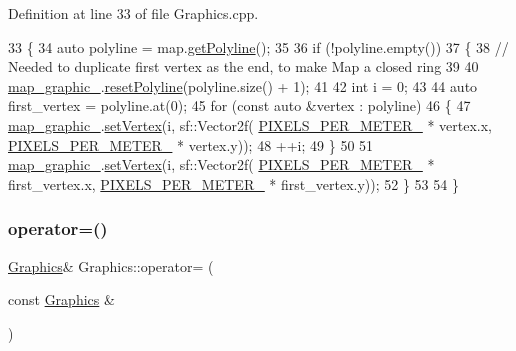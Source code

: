Definition at line 33 of file Graphics.\+cpp.


\begin{DoxyCode}
33                                     \{
34     \textcolor{keyword}{auto} polyline = map.\hyperlink{classMap_a32d8cf8af3089a95e0471fd523050896}{getPolyline}();
35 
36     \textcolor{keywordflow}{if} (!polyline.empty())
37     \{
38         \textcolor{comment}{// Needed to duplicate first vertex as the end, to make Map a closed ring}
39 
40         \hyperlink{classGraphics_a7b3e98774ea965783584d5351c730276}{map\_graphic\_}.\hyperlink{classMapGraphics_a389137596a79ed6a8239fe5451f8f470}{resetPolyline}(polyline.size() + 1);
41 
42         \textcolor{keywordtype}{int} i = 0;
43 
44         \textcolor{keyword}{auto} first\_vertex = polyline.at(0);
45         \textcolor{keywordflow}{for} (\textcolor{keyword}{const} \textcolor{keyword}{auto} &vertex : polyline)
46         \{
47             \hyperlink{classGraphics_a7b3e98774ea965783584d5351c730276}{map\_graphic\_}.\hyperlink{classMapGraphics_a0d58d85db2e9d6e62623ebab6ffa11e9}{setVertex}(i, sf::Vector2f(
      \hyperlink{classGraphics_af9c6251065c2900d0a92380c2bea26b2}{PIXELS\_PER\_METER\_} * vertex.x, \hyperlink{classGraphics_af9c6251065c2900d0a92380c2bea26b2}{PIXELS\_PER\_METER\_} * vertex.y));
48             ++i;
49         \}
50 
51         \hyperlink{classGraphics_a7b3e98774ea965783584d5351c730276}{map\_graphic\_}.\hyperlink{classMapGraphics_a0d58d85db2e9d6e62623ebab6ffa11e9}{setVertex}(i, sf::Vector2f(
      \hyperlink{classGraphics_af9c6251065c2900d0a92380c2bea26b2}{PIXELS\_PER\_METER\_} * first\_vertex.x, \hyperlink{classGraphics_af9c6251065c2900d0a92380c2bea26b2}{PIXELS\_PER\_METER\_} * first\_vertex.y));
52     \}
53 
54 \}
\end{DoxyCode}
\mbox{\label{classGraphics_abaf6bc20f9541026835dfee157ac5efb}} 
\subsubsection{\texorpdfstring{operator=()}{operator=()}}
{\footnotesize\ttfamily \hyperlink{classGraphics}{Graphics}\& Graphics\+::operator= (\begin{DoxyParamCaption}\item[{const \hyperlink{classGraphics}{Graphics} \&}]{ }\end{DoxyParamCaption})\hspace{0.3cm}{\ttfamily [delete]}}

